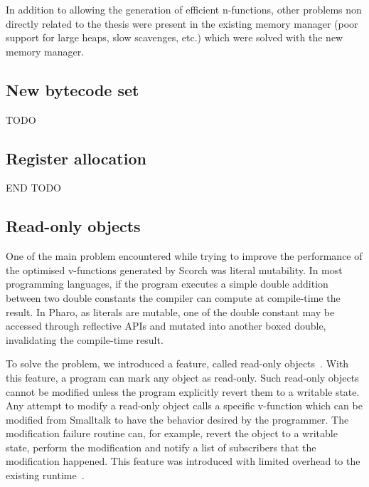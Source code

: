 \documentclass[a4paper,12pt,twoside]{../includes/ThesisStyle}
\begin{document}
In addition to allowing the generation of efficient n-functions, other problems non directly related to the thesis were present in the existing memory manager (poor support for large heaps, slow scavenges, etc.) which were solved with the new memory manager.


\subsection{New bytecode set}

TODO 




\subsection{Register allocation}


END TODO

\subsection{Read-only objects}

One of the main problem encountered while trying to improve the performance of the optimised v-functions generated by Scorch was literal mutability. In most programming languages, if the program executes a simple double addition between two double constants the compiler can compute at compile-time the result. In Pharo, as literals are mutable, one of the double constant may be accessed through reflective APIs and mutated into another boxed double, invalidating the compile-time result. 

To solve the problem, we introduced a feature, called read-only objects~\cite{Bera16b}. With this feature, a program can mark any object as read-only. Such read-only objects cannot be modified unless the program explicitly revert them to a writable state. Any attempt to modify a read-only object calls a specific v-function which can be modified from Smalltalk to have the behavior desired by the programmer. The modification failure routine can, for example, revert the object to a writable state, perform the modification and notify a list of subscribers that the modification happened. This feature was introduced with limited overhead to the existing runtime~\cite{Bera16b}. 
\end{document}
